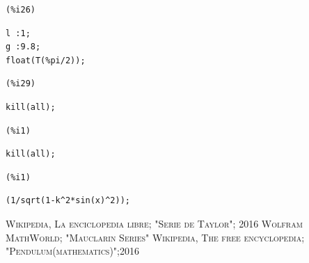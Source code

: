 \documentclass[12pt]{article}
\begin{document}
\noindent
\begin{minipage}[t]{8ex}{\color{red}\bf
\begin{verbatim}
(%i26) 
\end{verbatim}}
\end{minipage}
\begin{minipage}[t]{\textwidth}{\color{blue}
\begin{verbatim}
l :1;
g :9.8;
float(T(%pi/2));
\end{verbatim}}
\end{minipage}

\noindent
\begin{minipage}[t]{8ex}{\color{red}\bf
\begin{verbatim}
(%i29) 
\end{verbatim}}
\end{minipage}
\begin{minipage}[t]{\textwidth}{\color{blue}
\begin{verbatim}
kill(all);
\end{verbatim}}
\end{minipage}

\noindent
\begin{minipage}[t]{8ex}{\color{red}\bf
\begin{verbatim}
(%i1) 
\end{verbatim}}
\end{minipage}
\begin{minipage}[t]{\textwidth}{\color{blue}
\begin{verbatim}
kill(all);
\end{verbatim}}
\end{minipage}

\noindent
\begin{minipage}[t]{8ex}{\color{red}\bf
\begin{verbatim}
(%i1) 
\end{verbatim}}
\end{minipage}
\begin{minipage}[t]{\textwidth}{\color{blue}
\begin{verbatim}
(1/sqrt(1-k^2*sin(x)^2));
\end{verbatim}}
\end{minipage}

\pagebreak
\begin{thebibliography}{X}
  \textsc{Wikipedia, La enciclopedia libre; "Serie de Taylor"; 2016}
  \textsc{Wolfram MathWorld; "Mauclarin Series"}
  \textsc{Wikipedia, The free encyclopedia; "Pendulum(mathematics)";2016}
\end{thebibliography}
\end{document}

